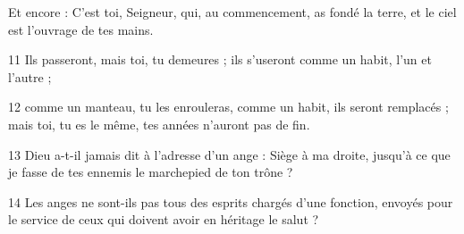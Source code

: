 
Et encore : C’est toi, Seigneur, qui, au commencement, as fondé la terre, et le ciel est l’ouvrage de tes mains.

11 Ils passeront, mais toi, tu demeures ; ils s’useront comme un habit, l’un et l’autre ;

12 comme un manteau, tu les enrouleras, comme un habit, ils seront remplacés ; mais toi, tu es le même, tes années n’auront pas de fin.

13 Dieu a-t-il jamais dit à l’adresse d’un ange : Siège à ma droite, jusqu’à ce que je fasse de tes ennemis le marchepied de ton trône ?

14 Les anges ne sont-ils pas tous des esprits chargés d’une fonction, envoyés pour le service de ceux qui doivent avoir en héritage le salut ?